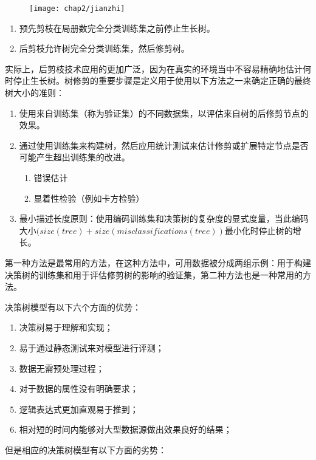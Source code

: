 \begin{figure}[!htp]
    \centering
    \texttt{[image: chap2/jianzhi]}
\end{figure}

\begin{enumerate}
    \item 预先剪枝在局册数完全分类训练集之前停止生长树。
    \item 后剪枝允许树完全分类训练集，然后修剪树。
\end{enumerate}

实际上，后剪枝技术应用的更加广泛，因为在真实的环境当中不容易精确地估计何时停止生长树。树修剪的重要步骤是定义用于使用以下方法之一来确定正确的最终树大小的准则：

\begin{enumerate}
    \item 使用来自训练集（称为验证集）的不同数据集，以评估来自树的后修剪节点的效果。
    \item 通过使用训练集来构建树，然后应用统计测试来估计修剪或扩展特定节点是否可能产生超出训练集的改进。
    \begin{enumerate}
        \item 错误估计
        \item 显着性检验（例如卡方检验）
    \end{enumerate}
    \item 最小描述长度原则：使用编码训练集和决策树的复杂度的显式度量，当此编码大小$(size(tree)+ size(misclassifications(tree))$最小化时停止树的增长。
\end{enumerate}
第一种方法是最常用的方法，在这种方法中，可用数据被分成两组示例：用于构建决策树的训练集和用于评估修剪树的影响的验证集，第二种方法也是一种常用的方法。

决策树模型有以下六个方面的优势：

\begin{enumerate}
    \item 决策树易于理解和实现；
    \item 易于通过静态测试来对模型进行评测；
    \item 数据无需预处理过程；
    \item 对于数据的属性没有明确要求；
    \item 逻辑表达式更加直观易于推到；
    \item 相对短的时间内能够对大型数据源做出效果良好的结果；
\end{enumerate}

但是相应的决策树模型有以下方面的劣势：

